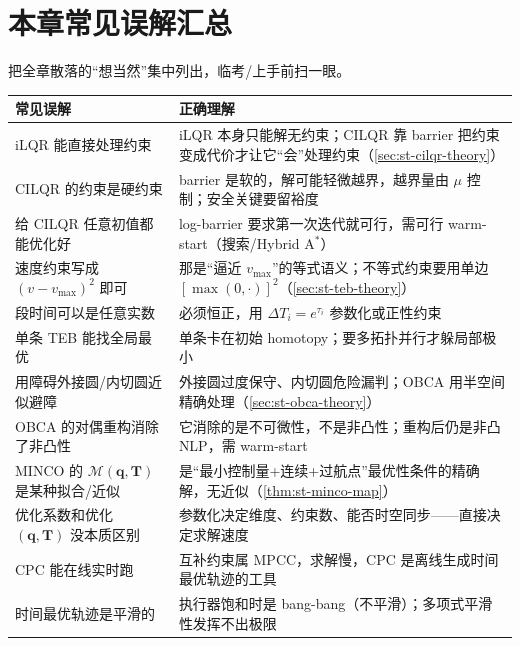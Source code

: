 \section*{本章常见误解汇总}
把全章散落的“想当然”集中列出，临考/上手前扫一眼。

\begin{table}[H]\centering\small
\begin{tabular}{p{} p{}}
\toprule
\textbf{常见误解} & \textbf{正确理解} \\
\midrule
iLQR 能直接处理约束 & iLQR 本身只能解无约束；CILQR 靠 barrier 把约束变成代价才让它“会”处理约束（\cref{sec:st-cilqr-theory}） \\
CILQR 的约束是硬约束 & barrier 是软的，解可能轻微越界，越界量由 $\mu$ 控制；安全关键要留裕度 \\
给 CILQR 任意初值都能优化好 & log-barrier 要求第一次迭代就可行，需可行 warm-start（搜索/Hybrid A$^*$） \\
速度约束写成 $(v-v_{\max})^2$ 即可 & 那是“逼近 $v_{\max}$”的等式语义；不等式约束要用单边 $[\max(0,\cdot)]^2$（\cref{sec:st-teb-theory}） \\
段时间可以是任意实数 & 必须恒正，用 $\Delta T_i=e^{\tau_i}$ 参数化或正性约束 \\
单条 TEB 能找全局最优 & 单条卡在初始 homotopy；要多拓扑并行才躲局部极小 \\
用障碍外接圆/内切圆近似避障 & 外接圆过度保守、内切圆危险漏判；OBCA 用半空间精确处理（\cref{sec:st-obca-theory}） \\
OBCA 的对偶重构消除了非凸性 & 它消除的是不可微性，不是非凸性；重构后仍是非凸 NLP，需 warm-start \\
MINCO 的 $\mathcal M(\mathbf q,\mathbf T)$ 是某种拟合/近似 & 是“最小控制量+连续+过航点”最优性条件的精确解，无近似（\cref{thm:st-minco-map}） \\
优化系数和优化 $(\mathbf q,\mathbf T)$ 没本质区别 & 参数化决定维度、约束数、能否时空同步——直接决定求解速度 \\
CPC 能在线实时跑 & 互补约束属 MPCC，求解慢，CPC 是离线生成时间最优轨迹的工具 \\
时间最优轨迹是平滑的 & 执行器饱和时是 bang-bang（不平滑）；多项式平滑性发挥不出极限 \\
\bottomrule
\end{tabular}
\end{table}

